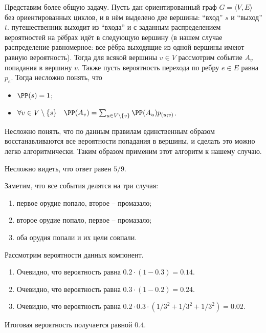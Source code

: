 \documentclass[12pt,a4paper]{article}
\begin{document}
    \begin{problem}{3}
        Представим более общую задачу. Пусть дан ориентированный граф $G = \langle V, E \rangle$ без ориентированных циклов, и в нём выделено две вершины: ``вход'' $s$ и ``выход'' $t$. путешественник выходит из ``входа'' и с заданным распределением вероятностей на рёбрах идёт в следующую вершину (в нашем случае распределение равномерное: все рёбра выходящие из одной вершины имеют равную вероятность). Тогда для всякой вершины $v \in V$ рассмотрим событие $A_v$ попадания в вершину $v$. Также пусть вероятность перехода по ребру $e \in E$ равна $p_e$. Тогда несложно понять, что
        \begin{itemize}
            \item $\PP(s) = 1$;
            \item $\forall v \in V \setminus \{s\} \quad \PP(A_v) = \sum_{u \in V \setminus \{v\}} \PP(A_u) p_{(u; v)}$.
        \end{itemize}
        
        Несложно понять, что по данным правилам единственным образом восстанавливаются все вероятности попадания в вершины, и сделать это можно легко алгоритмически. Таким образом применим этот алгоритм к нашему случаю.

        Несложно видеть, что ответ равен $5/9$.
    \end{problem}

    \begin{problem}{5}
        Заметим, что все события делятся на три случая:
        \begin{enumerate}
            \item первое орудие попало, второе -- промазало;
            \item второе орудие попало, первое -- промазало;
            \item оба орудия попали и их цели совпали.
        \end{enumerate}

        Рассмотрим вероятности данных компонент.
        \begin{enumerate}
            \item Очевидно, что вероятность равна $0.2 \cdot (1 - 0.3) = 0.14$.
            \item Очевидно, что вероятность равна $0.3 \cdot (1 - 0.2) = 0.24$.
            \item Очевидно, что вероятность равна $0.2 \cdot 0.3 \cdot (1/3^2 + 1/3^2 + 1/3^2) = 0.02$.
        \end{enumerate}

        Итоговая вероятность получается равной $0.4$.
    \end{problem}
\end{document}
